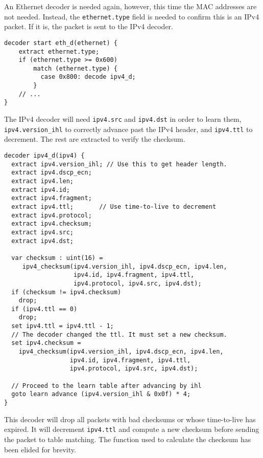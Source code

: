 An Ethernet decoder is needed again, however, this time the MAC
addresses are not needed. Instead, the \texttt{ethernet.type} field is needed to confirm
this is an IPv4 packet. If it is, the packet is sent to the IPv4 decoder.

\begin{codepage}
\begin{lstlisting}
decoder start eth_d(ethernet) {
	extract ethernet.type;
	if (ethernet.type >= 0x600)
	    match (ethernet.type) {
	      case 0x800: decode ipv4_d;
	    }
	// ...
}
\end{lstlisting}
\end{codepage}

The IPv4 decoder will need  \texttt{ipv4.src} and \texttt{ipv4.dst} in
order to learn them, \texttt{ipv4.version\_ihl} to
correctly advance past the IPv4 header, and \texttt{ipv4.ttl} to decrement. The rest are extracted to verify the checksum.

\begin{codepage}
\begin{lstlisting}
decoder ipv4_d(ipv4) {
  extract ipv4.version_ihl; // Use this to get header length.
  extract ipv4.dscp_ecn;
  extract ipv4.len;
  extract ipv4.id;
  extract ipv4.fragment;
  extract ipv4.ttl;       // Use time-to-live to decrement
  extract ipv4.protocol;
  extract ipv4.checksum;
  extract ipv4.src;
  extract ipv4.dst;

  var checksum : uint(16) =
     ipv4_checksum(ipv4.version_ihl, ipv4.dscp_ecn, ipv4.len, 
                   ipv4.id, ipv4.fragment, ipv4.ttl, 
                   ipv4.protocol, ipv4.src, ipv4.dst);
  if (checksum != ipv4.checksum)
    drop;
  if (ipv4.ttl == 0)
    drop;
  set ipv4.ttl = ipv4.ttl - 1;
  // The decoder changed the ttl. It must set a new checksum.
  set ipv4.checksum =
    ipv4_checksum(ipv4.version_ihl, ipv4.dscp_ecn, ipv4.len, 
                  ipv4.id, ipv4.fragment, ipv4.ttl, 
                  ipv4.protocol, ipv4.src, ipv4.dst);

  // Proceed to the learn table after advancing by ihl
  goto learn advance (ipv4.version_ihl & 0x0f) * 4;
}
\end{lstlisting}
\end{codepage}

This decoder will drop all packets with bad checksums or whose time-to-live has 
expired. It will decrement \texttt{ipv4.ttl} and compute a new checksum before 
sending the packet to table matching. The function used to calculate the checksum
has been elided for brevity.

